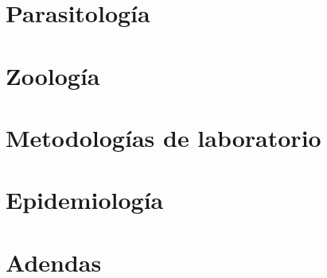 \documentclass[a4paper, oneside, 10pt]{book}
\begin{document}
    \part{Parasitología}
    
    
    
    
    
    \part{Zoología}
    
    \part{Metodologías de laboratorio}
    
    \part{Epidemiología}
    
    
    
    \part{Adendas}
    \appendix
    \renewcommand*{\thesection}{\Alph{section}}\textbf{}
    
    \clearpage
    
    \clearpage
    
    \clearpage
    \renewcommand*{\thesection}{}\textbf{}
    
    
    
\end{document}
